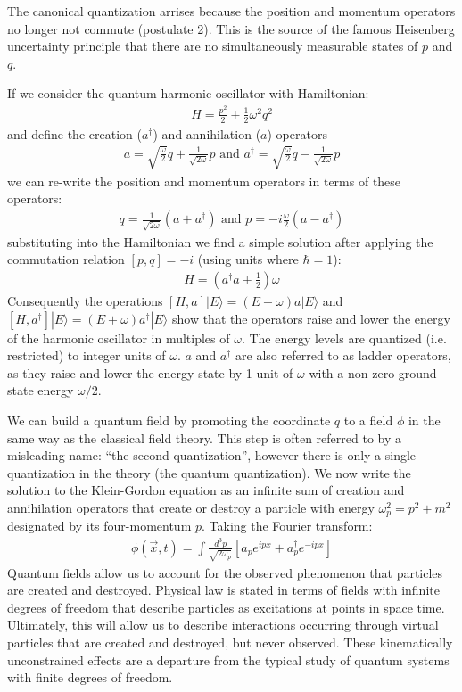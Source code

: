 The canonical quantization arrises because the position and momentum operators no longer not commute (postulate 2). 
This is the source of the famous Heisenberg uncertainty principle that there are no simultaneously measurable states of $p$ and $q$. 

If we consider the quantum harmonic oscillator with Hamiltonian:
\begin{align*}
H = \frac{p^2}{2} + \frac{1}{2}\omega^2 q^2
\end{align*}
and define the creation ($a^\dagger$) and annihilation ($a$) operators
\begin{align*}
a = \sqrt{\frac{\omega}{2}}q + \frac{1}{\sqrt{2\omega}}p \text{ and   } a^\dagger = \sqrt{\frac{\omega}{2}}q - \frac{1}{\sqrt{2\omega}}p 
\end{align*}
we can re-write the position and momentum operators in terms of these operators:
\begin{align*}
q = \frac{1}{\sqrt{2\omega}} (a + a^\dagger) \text{ and } p = -i \frac{\omega}{2}( a - a^\dagger) 
\end{align*}
substituting into the Hamiltonian we find a simple solution after applying
the commutation relation $[p,q]=-i$ (using units where $\hbar=1$):
\begin{align*}
H = \left (a^\dagger a + \frac{1}{2} \right)  \omega
\end{align*}
Consequently the operations $[H,a]|E\rangle = (E-\omega)a|E\rangle$ and 
$[H,a^\dagger]|E\rangle = (E+\omega)a^\dagger|E\rangle$ show that the operators raise and 
lower the energy of the harmonic oscillator in multiples of $\omega$. The energy levels are quantized (i.e. 
restricted) to integer units of $\omega$. $a$ and $a^\dagger$ are also referred to as ladder operators,
as they raise and lower the energy state by 1 unit of $\omega$ with a non zero ground
 state energy $\omega / 2$. 

We can build a quantum field by promoting the coordinate $q$ to a field $\phi$ in the same
way as the classical field theory. This step is often referred to by a misleading name:
``the second quantization'', however there is only a single quantization in
the theory (the quantum quantization). We now write the solution to the Klein-Gordon
equation as an infinite sum of creation and annihilation operators that create 
or destroy a particle with energy $\omega_p^2 = p^2 + m^2$ designated by its four-momentum 
$p$. Taking the Fourier transform:
\begin{align*}
\phi(\vec x,t) = \int \frac{d^3p}{\sqrt{2\omega_{p}}} \left [  a_p e^{ipx} + a_p^\dagger e^{-ipx} \right ]
\end{align*} 
Quantum fields allow us to account for the observed phenomenon that particles are created and destroyed. 
Physical law is stated in terms of fields with infinite degrees of freedom that describe particles as excitations 
at points in space time. Ultimately, this will allow us to describe interactions occurring through
 virtual particles that are created and destroyed, but never observed. These kinematically unconstrained effects 
are a departure from the typical study of quantum systems with finite degrees of freedom. 

